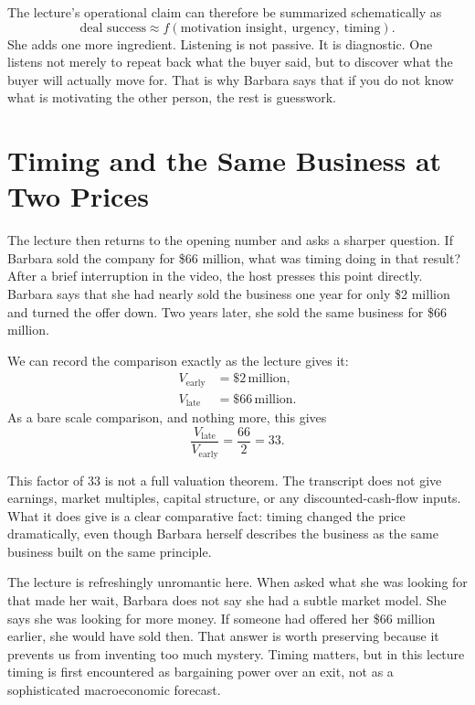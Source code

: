 The lecture's operational claim can therefore be summarized schematically as
\begin{equation}
\text{deal success} \approx f(\text{motivation insight},\ \text{urgency},\ \text{timing}).
\end{equation}
She adds one more ingredient. Listening is not passive. It is diagnostic. One listens not merely to repeat back what the buyer said, but to discover what the buyer will actually move for. That is why Barbara says that if you do not know what is motivating the other person, the rest is guesswork.

\section{Timing and the Same Business at Two Prices}

The lecture then returns to the opening number and asks a sharper question. If Barbara sold the company for \$66 million, what was timing doing in that result? After a brief interruption in the video, the host presses this point directly. Barbara says that she had nearly sold the business one year for only \$2 million and turned the offer down. Two years later, she sold the same business for \$66 million.

We can record the comparison exactly as the lecture gives it:
\begin{align}
V_{\text{early}} &= \$2\,\text{million},\\
V_{\text{late}} &= \$66\,\text{million}.
\end{align}
As a bare scale comparison, and nothing more, this gives
\begin{equation}
\frac{V_{\text{late}}}{V_{\text{early}}}=\frac{66}{2}=33.
\end{equation}

\begin{remark}
This factor of \(33\) is not a full valuation theorem. The transcript does not give earnings, market multiples, capital structure, or any discounted-cash-flow inputs. What it does give is a clear comparative fact: timing changed the price dramatically, even though Barbara herself describes the business as the same business built on the same principle.
\end{remark}

The lecture is refreshingly unromantic here. When asked what she was looking for that made her wait, Barbara does not say she had a subtle market model. She says she was looking for more money. If someone had offered her \$66 million earlier, she would have sold then. That answer is worth preserving because it prevents us from inventing too much mystery. Timing matters, but in this lecture timing is first encountered as bargaining power over an exit, not as a sophisticated macroeconomic forecast.

